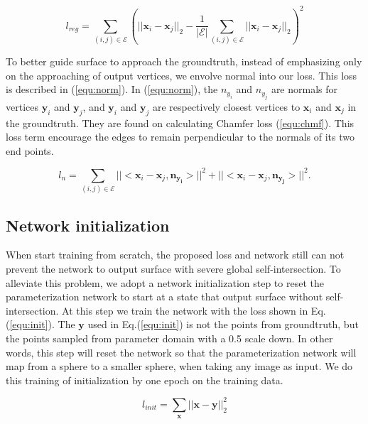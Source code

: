 \begin{equation}
\label{equ:reg}
l_{reg} = \sum_{(i,j)\in\mathcal{E}}(||\mathbf{x}_i-\mathbf{x}_j||_2 - \frac{1}{|\mathcal{E}|}\sum_{(i,j)\in\mathcal{E} }||\mathbf{x}_i-\mathbf{x}_j||_2)^2
\end{equation}

 To better guide surface to approach the groundtruth, instead of emphasizing only on the approaching of output vertices, we envolve normal into our loss. This loss is described in (\ref{equ:norm}). In (\ref{equ:norm}), the $n_{y_i}$ and $n_{y_j}$ are normals for vertices $\mathbf{y}_i$ and $\mathbf{y}_j$, and $\mathbf{y}_i$ and $\mathbf{y}_j$ are respectively closest vertices to $\mathbf{x}_i$ and $\mathbf{x}_j$ in the groundtruth. They are found on calculating Chamfer loss (\ref{equ:chmf}). This loss term encourage the edges to remain perpendicular to the normals of its two end points.

\begin{equation}
\label{equ:norm}
l_{n} = \sum_{(i,j)\in\mathcal{E}}||<\mathbf{x}_i-\mathbf{x}_j,\mathbf{n_{y_i}}>||^2 + ||<\mathbf{x}_i-\mathbf{x}_j,\mathbf{n_{y_j}}>||^2.
\end{equation}

\subsection{Network initialization}
When start training from scratch, the proposed loss and network still can not prevent the network to output surface with severe global self-intersection. To alleviate this problem, we adopt a network initialization step to reset the parameterization network to start at a state that output surface without self-intersection. At this step we train the network with the loss shown in Eq.(\ref{equ:init}). The $\mathbf{y}$ used in Eq.(\ref{equ:init}) is not the points from groundtruth, but the points sampled from parameter domain with a 0.5 scale down. In other words, this step will reset the network so that the parameterization network will map from a sphere to a smaller sphere, when taking any image as input. We do this training of initialization by one epoch on the training data. 

\begin{equation}
\label{equ:init}
l_{init} = \sum_\mathbf{x}||\mathbf{x} - \mathbf{y}||_2^2
\end{equation}

